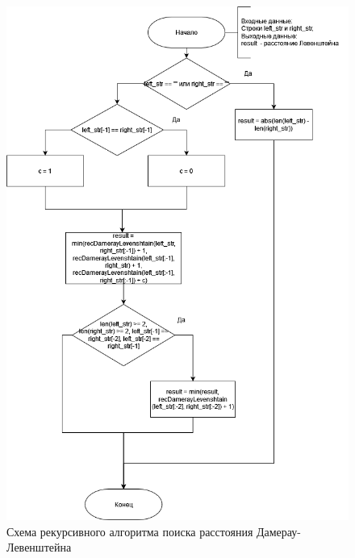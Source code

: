 \newpage 
\begin{figure}[H]
	\begin{center}
		\includegraphics[scale=0.6]{assets/recDamerayLevenshtain.png}
	\end{center}
	\caption{Схема рекурсивного алгоритма поиска расстояния Дамерау-Левенштейна}
\end{figure}

